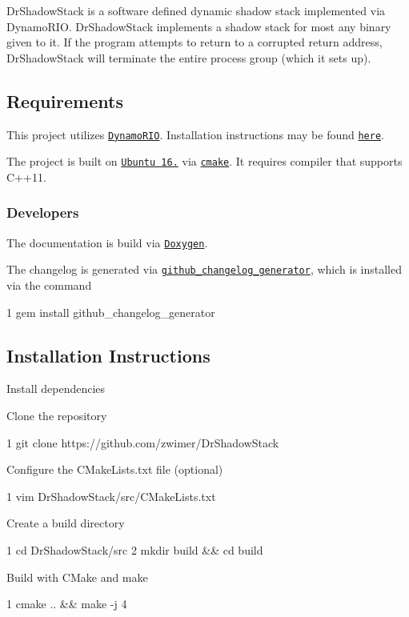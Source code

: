 Dr\+Shadow\+Stack is a software defined dynamic shadow stack implemented via Dynamo\+R\+IO. Dr\+Shadow\+Stack implements a shadow stack for most any binary given to it. If the program attempts to return to a corrupted return address, Dr\+Shadow\+Stack will terminate the entire process group (which it sets up).

\subsection*{Requirements}

This project utilizes \href{https://github.com/DynamoRIO/dynamorio}{\tt Dynamo\+R\+IO}. Installation instructions may be found \href{https://github.com/DynamoRIO/dynamorio/wiki/How-To-Build}{\tt here}.

The project is built on \href{http://releases.ubuntu.com/16.04.4/}{\tt Ubuntu 16.} via \href{https://cmake.org/}{\tt cmake}. It requires compiler that supports {\ttfamily C++11}.

\subsubsection*{Developers}

The documentation is build via \href{http://www.stack.nl/~dimitri/doxygen/}{\tt Doxygen}.

The changelog is generated via \href{https://github.com/skywinder/github-changelog-generator}{\tt github\+\_\+changelog\+\_\+generator}, which is installed via the command 
\begin{DoxyCode}
1 gem install github\_changelog\_generator
\end{DoxyCode}


\subsection*{Installation Instructions}


\begin{DoxyEnumerate}
\item Install dependencies
\item Clone the repository 
\begin{DoxyCode}
1 git clone https://github.com/zwimer/DrShadowStack
\end{DoxyCode}

\item Configure the C\+Make\+Lists.\+txt file (optional) 
\begin{DoxyCode}
1 vim DrShadowStack/src/CMakeLists.txt
\end{DoxyCode}

\item Create a build directory 
\begin{DoxyCode}
1 cd DrShadowStack/src
2 mkdir build && cd build
\end{DoxyCode}

\item Build with C\+Make and make 
\begin{DoxyCode}
1 cmake .. && make -j 4
\end{DoxyCode}

\end{DoxyEnumerate}

